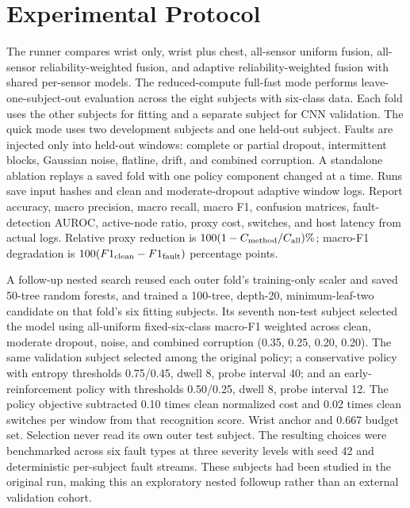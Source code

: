 \documentclass[conference]{IEEEtran}
\begin{document}
\section{Experimental Protocol}
The runner compares wrist only, wrist plus chest, all-sensor uniform fusion, all-sensor reliability-weighted fusion, and adaptive reliability-weighted fusion with shared per-sensor models. The reduced-compute full-fast mode performs leave-one-subject-out evaluation across the eight subjects with six-class data. Each fold uses the other subjects for fitting and a separate subject for CNN validation. The quick mode uses two development subjects and one held-out subject. Faults are injected only into held-out windows: complete or partial dropout, intermittent blocks, Gaussian noise, flatline, drift, and combined corruption. A standalone ablation replays a saved fold with one policy component changed at a time. Runs save input hashes and clean and moderate-dropout adaptive window logs. Report accuracy, macro precision, macro recall, macro F1, confusion matrices, fault-detection AUROC, active-node ratio, proxy cost, switches, and host latency from actual logs. Relative proxy reduction is $100(1-C_{\rm method}/C_{\rm all})\%$; macro-F1 degradation is $100(F1_{\rm clean}-F1_{\rm fault})$ percentage points.

A follow-up nested search reused each outer fold's training-only scaler and saved 50-tree random forests, and trained a 100-tree, depth-20, minimum-leaf-two candidate on that fold's six fitting subjects. Its seventh non-test subject selected the model using all-uniform fixed-six-class macro-F1 weighted across clean, moderate dropout, noise, and combined corruption (0.35, 0.25, 0.20, 0.20). The same validation subject selected among the original policy; a conservative policy with entropy thresholds 0.75/0.45, dwell 8, probe interval 40; and an early-reinforcement policy with thresholds 0.50/0.25, dwell 8, probe interval 12. The policy objective subtracted 0.10 times clean normalized cost and 0.02 times clean switches per window from that recognition score. Wrist anchor and 0.667 budget set. Selection never read its own outer test subject. The resulting choices were benchmarked across six fault types at three severity levels with seed 42 and deterministic per-subject fault streams. These subjects had been studied in the original run, making this an exploratory nested followup rather than an external validation cohort.
\end{document}
